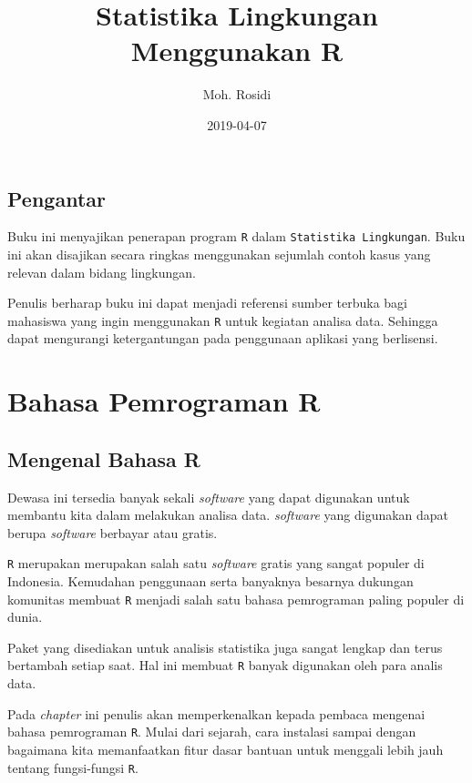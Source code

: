 \documentclass[]{book}
\title{Statistika Lingkungan Menggunakan R}
\author{Moh. Rosidi}
\date{2019-04-07}
\begin{document}
\maketitle

{
\hypersetup{linkcolor=black}
\setcounter{tocdepth}{1}
\tableofcontents
}
\listoftables
\listoffigures
\chapter*{Pengantar}\label{pengantar}

Buku ini menyajikan penerapan program \texttt{R} dalam
\texttt{Statistika\ Lingkungan}. Buku ini akan disajikan secara ringkas
menggunakan sejumlah contoh kasus yang relevan dalam bidang lingkungan.

Penulis berharap buku ini dapat menjadi referensi sumber terbuka bagi
mahasiswa yang ingin menggunakan \texttt{R} untuk kegiatan analisa data.
Sehingga dapat mengurangi ketergantungan pada penggunaan aplikasi yang
berlisensi.

\part*{Bahasa Pemrograman R}\label{part-bahasa-pemrograman-r}

\chapter{Mengenal Bahasa R}\label{mengenal-bahasa-r}

Dewasa ini tersedia banyak sekali \emph{software} yang dapat digunakan
untuk membantu kita dalam melakukan analisa data. \emph{software} yang
digunakan dapat berupa \emph{software} berbayar atau gratis.

\texttt{R} merupakan merupakan salah satu \emph{software} gratis yang
sangat populer di Indonesia. Kemudahan penggunaan serta banyaknya
besarnya dukungan komunitas membuat \texttt{R} menjadi salah satu bahasa
pemrograman paling populer di dunia.

Paket yang disediakan untuk analisis statistika juga sangat lengkap dan
terus bertambah setiap saat. Hal ini membuat \texttt{R} banyak digunakan
oleh para analis data.

Pada \emph{chapter} ini penulis akan memperkenalkan kepada pembaca
mengenai bahasa pemrograman \texttt{R}. Mulai dari sejarah, cara
instalasi sampai dengan bagaimana kita memanfaatkan fitur dasar bantuan
untuk menggali lebih jauh tentang fungsi-fungsi \texttt{R}.
\end{document}
